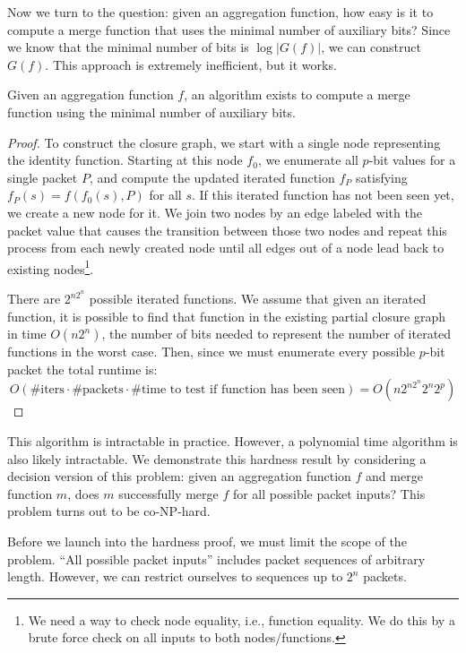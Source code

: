 Now we turn to the question: given an aggregation function, how easy is it to compute a merge function that uses the minimal number of auxiliary bits? Since we know that the minimal number of bits is $\log |G(f)|$, we can construct $G(f)$. This approach is extremely inefficient, but it works. 

\begin{theorem}
Given an aggregation function $f$, an algorithm exists to compute a merge function using the minimal number of auxiliary bits.
\end{theorem}
\begin{proof}
To construct the closure graph, we start with a single node representing the
identity function. Starting at this node $f_0$, we enumerate all $p$-bit values for a
single packet $P$, and compute the updated iterated function $f_P$ satisfying $f_P(s) = f(f_0(s), P)$ for all $s$.
If this iterated function has not been seen yet, we create a new node for it.
We join two nodes by an edge labeled
with the packet value that causes the transition between those two nodes and
repeat this process from each newly created node until all edges out of a node
lead back to existing nodes\footnote{We need a way to check node equality,
i.e., function equality. We do this by a brute force check on all inputs to
both nodes/functions.}.

There are $2^{n2^n}$ possible iterated functions. We assume that given an iterated function,
it is possible to find that function in the existing partial closure graph in time $O(n2^n)$,
the number of bits needed to represent the number of iterated functions in the worst case.
Then, since we must enumerate every possible $p$-bit packet the total runtime is:
\[ O(\text{\# iters} \cdot \text{\# packets} \cdot \text{\# time to test if function has been seen}) = O\left(n2^{n2^n}2^n2^p\right) \]
\end{proof}

This algorithm is intractable in practice. However, a polynomial time algorithm is also likely intractable.
We demonstrate this hardness result by considering a decision version of this problem:
given an aggregation function $f$ and merge function $m$, does $m$ successfully merge $f$ for all possible packet inputs?
This problem turns out to be co-NP-hard.

Before we launch into the hardness proof, we must limit the scope of the problem. ``All possible packet inputs'' includes
packet sequences of arbitrary length. However, we can restrict ourselves to sequences up to $2^n$ packets.

